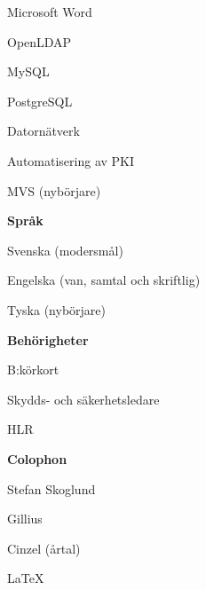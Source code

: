 \documentclass[a4paper,swedish,10pt]{article}
\begin{document}
\begin{minipage}[t]{0.27\textwidth}
\begin{description}[nosep]
  \item Microsoft Word
  \item OpenLDAP
  \item MySQL
  \item PostgreSQL
  \item Datornätverk
  \item Automatisering av PKI
  \item MVS (nybörjare)
  \end{description}
  \vspace{0.5cm}
  \textbf{Språk}
  \begin{description}[nosep,itemsep=0.1ex]
    \raggedleft\small%
  \item Svenska (modersmål)
  \item Engelska (van, samtal och skriftlig)
  \item Tyska (nybörjare)
  \end{description}
  \vspace{0.5cm}
  \textbf{Behörigheter}
  \begin{description}[nosep]
    \raggedleft\setlength\itemsep{0.1ex}\small%
  \item B:körkort
  \item Skydds- och säkerhetsledare
  \item HLR
  \end{description}
  \vspace{5cm}
  \textbf{Colophon}
  \begin{description}[nosep]
    \raggedleft\setlength\itemsep{0.1ex}\small%
  \item Stefan Skoglund {}
  \item Gillius
  \item Cinzel (årtal)
  \item \LaTeX%
  \end{description}
\end{minipage}

\end{document}
